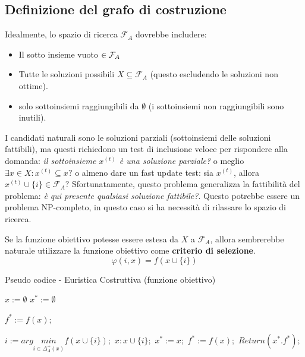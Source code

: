 \documentclass{article}
\begin{document}
\subsection{Definizione del grafo di costruzione}
Idealmente, lo spazio di ricerca $\mathcal{F}_A$ dovrebbe includere:
\begin{itemize}
    \item Il sotto insieme vuoto $\empty \in \mathcal{F}_A$
    \item Tutte le soluzioni possibili $X\subseteq\mathcal{F}_A$ (questo escludendo
          le soluzioni non ottime).
    \item solo sottoinsiemi raggiungibili da $\emptyset$ (i sottoinsiemi non raggiungibili sono inutili).
\end{itemize}
I candidati naturali sono le soluzioni parziali (sottoinsiemi delle soluzioni fattibili), ma questi
richiedono un test di inclusione veloce per rispondere alla domanda:
\textit{il sottoinsieme $x^{(t)}$ è una soluzione parziale?} o meglio $\exists x \in X : x^{(t)}\subseteq x?$
o almeno dare un fast update test: sia $x^{(t)}$, allora $x^{(t)} \cup \{i\}\in\mathcal{F}_A?$
Sfortunatamente, questo problema generalizza la fattibilità del problema: \textit{è qui presente qualsiasi soluzione fattibile?}.
Questo potrebbe essere un problema NP-completo, in questo caso si ha necessità di rilassare lo spazio di ricerca.

Se la funzione obiettivo potesse essere estesa da $X$ a $\mathcal{F}_A$, allora sembrerebbe naturale
utilizzare la funzione obiettivo come \textbf{criterio di selezione}.
$$\varphi(i,x)=f(x\cup\{i\})$$
\begin{algorithm}[H]
    \caption{Pseudo codice - Euristica Costruttiva (funzione obiettivo)}
    \label{alg:cons_heu_fx}
    \begin{algorithmic}
        \State $x:=\emptyset$
        \State $x^*:=\emptyset$

        \State $f^*:=f(x);$
        \Else
        \EndIf

        \State $i:=arg\underset{i\in\Delta_A^+(x)}{min}f(x\cup\{i\});$
        \State $x:x\cup\{i\};$
        \State $x^* := x;$
        \State $f^* := f(x);$
        \EndIf
        \EndWhile
        \State $Return(x^*.f^*);$
    \end{algorithmic}
\end{algorithm}
\end{document}
